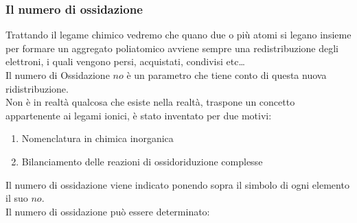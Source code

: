 \documentclass{article}
\begin{document}
\subsubsection{Il numero di ossidazione}
Trattando il legame chimico vedremo che quano due o più atomi si legano insieme per formare un aggregato
poliatomico avviene sempre una redistribuzione degli elettroni, i quali vengono persi, acquistati, condivisi etc\dots \\
Il numero di Ossidazione $no$ è un parametro che tiene conto di questa nuova ridistribuzione.\\
Non è in realtà qualcosa che esiste nella realtà, traspone un concetto appartenente ai legami ionici, è stato inventato per due motivi:
\begin{enumerate}
    \item Nomenclatura in chimica inorganica
    \item Bilanciamento delle reazioni di ossidoriduzione complesse
\end{enumerate}
Il numero di ossidazione viene indicato ponendo sopra il simbolo di ogni elemento il suo $no$.\\
Il numero di ossidazione può essere determinato:
\end{document}
